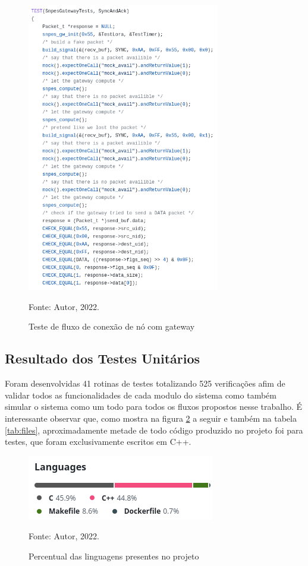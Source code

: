 \begin{figure}[H]
    \centering
	\caption{Teste de fluxo de conexão de nó com gateway}
    \includegraphics[width=0.75\textwidth,keepaspectratio]{img/test-gw.png}
    \label{fig:test-gw}
    
    Fonte: Autor, 2022.
\end{figure}

\subsection{Resultado dos Testes Unitários}

Foram desenvolvidas 41 rotinas de testes totalizando 525 verificações afim
de validar todos as funcionalidades de cada modulo do sistema como também
simular o sistema como um todo para todos os fluxos propostos nesse trabalho.
É interessante observar que, como mostra na figura \ref{fig:langs} a seguir
e também na tabela \ref{tab:files}, aproximadamente metade de todo código 
produzido no projeto foi para testes, que foram exclusivamente escritos em C++.

\begin{figure}[H]
    \centering
	\caption{Percentual das linguagens presentes no projeto}
    \includegraphics[height=0.11\textheight,keepaspectratio]{img/langs.png}
    \label{fig:langs}
    
    Fonte: Autor, 2022.
\end{figure}

